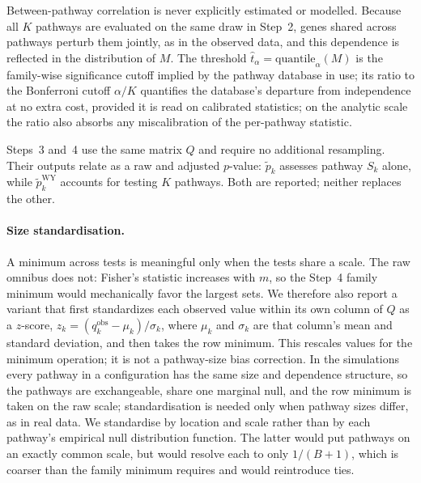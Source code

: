 Between-pathway correlation is never explicitly estimated or modelled. Because all $K$ pathways are evaluated on the same draw in Step~2, genes shared across pathways perturb them jointly, as in the observed data, and this dependence is reflected in the distribution of $M$. The threshold $\hat t_\alpha=\mathrm{quantile}_\alpha(M)$ is the family-wise significance cutoff implied by the pathway database in use; its ratio to the Bonferroni cutoff $\alpha/K$ quantifies the database’s departure from independence at no extra cost, provided it is read on calibrated statistics; on the analytic scale the ratio also absorbs any miscalibration of the per-pathway statistic.

Steps~3 and~4 use the same matrix $Q$ and require no additional resampling. Their outputs relate as a raw and adjusted $p$-value: $\tilde p_k$ assesses pathway $S_k$ alone, while $\tilde p^{\mathrm{WY}}_k$ accounts for testing $K$ pathways. Both are reported; neither replaces the other.

\paragraph{Size standardisation.}
A minimum across tests is meaningful only when the tests share a scale. The raw omnibus does not: Fisher’s statistic increases with $m$, so the Step~4 family minimum would mechanically favor the largest sets. We therefore also report a variant that first standardizes each observed value within its own column of $Q$ as a $z$-score, $z_k=(q^{\mathrm{obs}}_k-\mu_k)/\sigma_k$, where $\mu_k$ and $\sigma_k$ are that column’s mean and standard deviation, and then takes the row minimum. This rescales values for the minimum operation; it is not a pathway-size bias correction. In the simulations every pathway in a configuration has the same size and dependence structure, so the pathways are exchangeable, share one marginal null, and the row minimum is taken on the raw scale; standardisation is needed only when pathway sizes differ, as in real data. We standardise by location and scale rather than by each pathway's empirical null distribution function. The latter would put pathways on an exactly common scale, but would resolve each to only $1/(B+1)$, which is coarser than the family minimum requires and would reintroduce ties.

